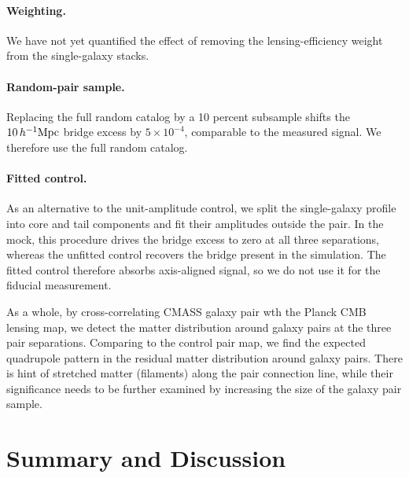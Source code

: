 \documentclass[preprint]{aastex701}
\newcommand{\hinvMpc}{h^{-1}{\rm Mpc}}
\newcommand{\ZZ}[1]{{\color{red} [ZZ: #1]}}
\begin{document}
\paragraph{Weighting.} We have not yet quantified the effect of removing the
lensing-efficiency weight from the single-galaxy stacks.

\paragraph{Random-pair sample.} Replacing the full random catalog by a
10 percent subsample shifts the $10\,\hinvMpc$ bridge excess by
$5\times10^{-4}$, comparable to the measured signal. We therefore use the
full random catalog. %

\paragraph{Fitted control.}
As an alternative to the unit-amplitude control, we split the single-galaxy
profile into core and tail components and fit their amplitudes outside the
pair. In the mock, this procedure drives the bridge excess to zero at all
three separations, whereas the unfitted control recovers the bridge present
in the simulation. The fitted control therefore absorbs axis-aligned signal,
so we do not use it for the fiducial measurement.

\medskip
\medskip

As a whole, by cross-correlating CMASS galaxy pair wth the Planck CMB lensing map, we detect the matter distribution around galaxy pairs at the three pair separations. Comparing to the control pair map, we find the expected quadrupole pattern in the residual matter distribution around galaxy pairs. There is hint of stretched matter (filaments) along the pair connection line, while their significance needs to be further examined by increasing the size of the galaxy pair sample.

\section{Summary and Discussion}
\label{sec:discussion}
\end{document}
